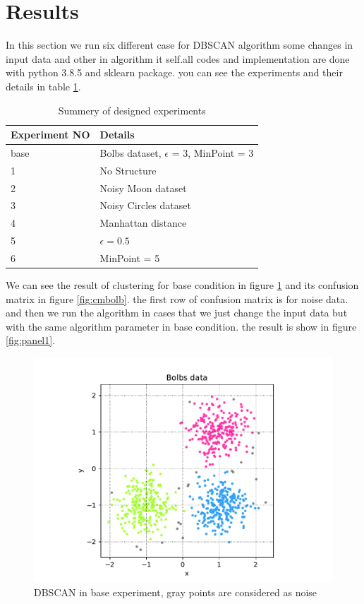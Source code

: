 \section{Results}
\label{sec:result}
In this section we run six different case for DBSCAN algorithm some changes in input data and other in algorithm it self.all codes and implementation are done with python 3.8.5 and sklearn package\cite{scikit-learn}. you can see the experiments and their details in table \ref{tab:experiments}.
\begin{table}
	\centering
	\caption{Summery of designed experiments}
	\label{tab:experiments}
	\begin{tabular}{ll}\toprule
		\textbf{Experiment NO} & \textbf{Details}\\
		\midrule
		base & Bolbs dataset, $\epsilon$ = 3, MinPoint = 3\\ \midrule\midrule
		1 & No Structure \\
		2 & Noisy Moon dataset \\
		3 & Noisy Circles dataset \\ \midrule 
		4 &  Manhattan distance \\ 
		5 &  $ \epsilon = 0.5 $ \\
		6 &  MinPoint = 5 \\ \bottomrule
	\end{tabular}
\end{table}
We can see the result of clustering for base condition in figure \ref{fig:bolb} and its confusion matrix in figure \ref{fig:cmbolb}. the first row of confusion matrix is for noise data.
and then we run the algorithm in cases that we just change the input data but with the same algorithm parameter in base condition. the result is show in figure \ref{fig:panel1}.
\begin{figure}[h]
	\centering
	\includegraphics[width=1\linewidth]{figures/bolb}
	\caption{DBSCAN in base experiment, gray points are considered as noise}
	\label{fig:bolb}
\end{figure}
